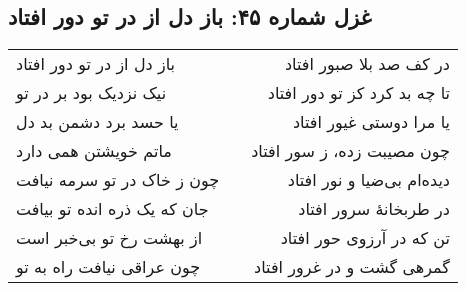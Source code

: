 \begin{center}
\section*{غزل شماره ۴۵: باز دل از در تو دور افتاد}
\label{sec:045}
\begin{longtable}{l p{0.5cm} r}
باز دل از در تو دور افتاد
&&
در کف صد بلا صبور افتاد
\\
نیک نزدیک بود بر در تو
&&
تا چه بد کرد کز تو دور افتاد
\\
یا حسد برد دشمن بد دل
&&
یا مرا دوستی غیور افتاد
\\
ماتم خویشتن همی دارد
&&
چون مصیبت زده، ز سور افتاد
\\
چون ز خاک در تو سرمه نیافت
&&
دیده‌ام بی‌ضیا و نور افتاد
\\
جان که یک ذره انده تو بیافت
&&
در طربخانهٔ سرور افتاد
\\
از بهشت رخ تو بی‌خبر است
&&
تن که در آرزوی حور افتاد
\\
چون عراقی نیافت راه به تو
&&
گمرهی گشت و در غرور افتاد
\\
\end{longtable}
\end{center}
